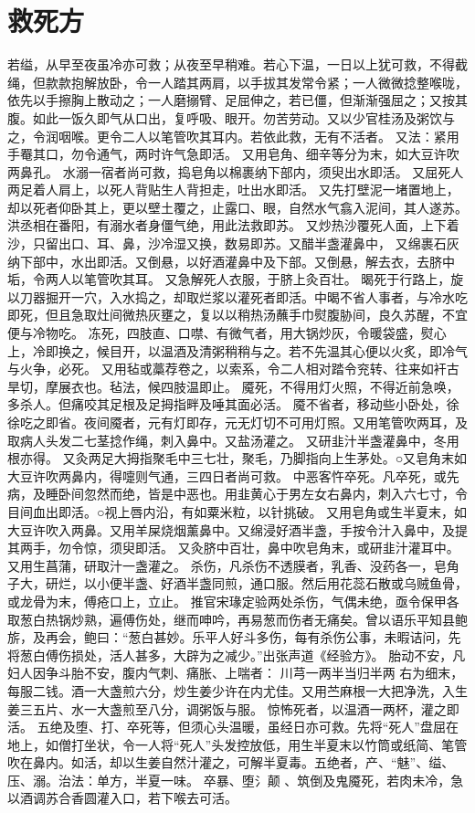 \documentclass[12pt,UTF8]{ctexbook}
\begin{document}
\chapter{救死方}
若缢，从早至夜虽冷亦可救；从夜至早稍难。若心下温，一日以上犹可救，不得截绳，但款款抱解放卧，令一人踏其两肩，以手拔其发常令紧；一人微微捻整喉咙，依先以手擦胸上散动之；一人磨搦臂、足屈伸之，若已僵，但渐渐强屈之；又按其腹。如此一饭久即气从口出，复呼吸、眼开。勿苦劳动。又以少官桂汤及粥饮与之，令润咽喉。更令二人以笔管吹其耳内。若依此救，无有不活者。
又法：紧用手罨其口，勿令通气，两时许气急即活。
又用皂角、细辛等分为末，如大豆许吹两鼻孔。
水溺一宿者尚可救，捣皂角以棉裹纳下部内，须臾出水即活。
又屈死人两足着人肩上，以死人背贴生人背担走，吐出水即活。
又先打壁泥一堵置地上，却以死者仰卧其上，更以壁土覆之，止露口、眼，自然水气翕入泥间，其人遂苏。洪丞相在番阳，有溺水者身僵气绝，用此法救即苏。
又炒热沙覆死人面，上下着沙，只留出口、耳、鼻，沙冷湿又换，数易即苏。又醋半盏灌鼻中，
又绵裹石灰纳下部中，水出即活。又倒悬，以好酒灌鼻中及下部。又倒悬，解去衣，去脐中垢，令两人以笔管吹其耳。
又急解死人衣服，于脐上灸百壮。
暍死于行路上，旋以刀器掘开一穴，入水捣之，却取烂浆以灌死者即活。中暍不省人事者，与冷水吃即死，但且急取灶间微热灰壅之，复以以稍热汤蘸手巾熨腹胁间，良久苏醒，不宜便与冷物吃。
冻死，四肢直、口噤、有微气者，用大锅炒灰，令暖袋盛，熨心上，冷即换之，候目开，以温酒及清粥稍稍与之。若不先温其心便以火炙，即冷气与火争，必死。
又用毡或藁荐卷之，以索系，令二人相对踏令兖转、往来如衦古旱切，摩展衣也。毡法，候四肢温即止。
魇死，不得用灯火照，不得近前急唤，多杀人。但痛咬其足根及足拇指畔及唾其面必活。
魇不省者，移动些小卧处，徐徐吃之即省。夜间魇者，元有灯即存，元无灯切不可用灯照。又用笔管吹两耳，及取病人头发二七茎捻作绳，刺入鼻中。又盐汤灌之。
又研韭汁半盏灌鼻中，冬用根亦得。
又灸两足大拇指聚毛中三七壮，聚毛，乃脚指向上生茅处。○又皂角末如大豆许吹两鼻内，得嚏则气通，三四日者尚可救。
中恶客忤卒死。凡卒死，或先病，及睡卧间忽然而绝，皆是中恶也。用韭黄心于男左女右鼻内，刺入六七寸，令目间血出即活。○视上唇内沿，有如粟米粒，以针挑破。
又用皂角或生半夏末，如大豆许吹入两鼻。又用羊屎烧烟薰鼻中。又绵浸好酒半盏，手按令汁入鼻中，及提其两手，勿令惊，须臾即活。
又灸脐中百壮，鼻中吹皂角末，或研韭汁灌耳中。
又用生菖蒲，研取汁一盏灌之。
杀伤，凡杀伤不透膜者，乳香、没药各一，皂角子大，研烂，以小便半盏、好酒半盏同煎，通口服。然后用花蕊石散或乌贼鱼骨，或龙骨为末，傅疮口上，立止。
推官宋瑑定验两处杀伤，气偶未绝，亟令保甲各取葱白热锅炒熟，遍傅伤处，继而呻吟，再易葱而伤者无痛矣。曾以语乐平知县鲍旂，及再会，鲍曰：“葱白甚妙。乐平人好斗多伤，每有杀伤公事，未暇诘问，先将葱白傅伤损处，活人甚多，大辟为之减少。”出张声道《经验方》。
胎动不安，凡妇人因争斗胎不安，腹内气刺、痛胀、上喘者：
川芎一两半当归半两
右为细末，每服二钱。酒一大盏煎六分，炒生姜少许在内尤佳。又用苎麻根一大把净洗，入生姜三五片、水一大盏煎至八分，调粥饭与服。
惊怖死者，以温酒一两杯，灌之即活。
五绝及堕、打、卒死等，但须心头温暖，虽经日亦可救。先将“死人”盘屈在地上，如僧打坐状，令一人将“死人”头发控放低，用生半夏末以竹筒或纸简、笔管吹在鼻内。如活，却以生姜自然汁灌之，可解半夏毒。五绝者，产、“魅”、缢、压、溺。治法：单方，半夏一味。
卒暴、堕氵颠 、筑倒及鬼魇死，若肉未冷，急以酒调苏合香圆灌入口，若下喉去可活。
\end{document}
